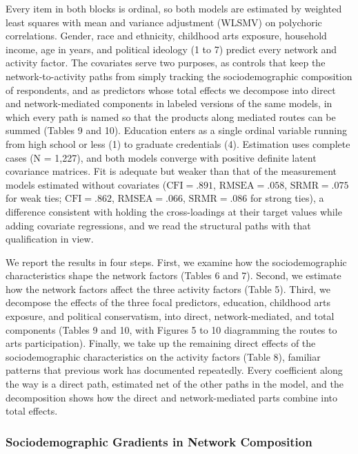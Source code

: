 \documentclass[
  12pt
]{article}
\begin{document}
Every item in both blocks is ordinal, so both models are estimated by weighted least squares with mean and variance adjustment (WLSMV) on polychoric correlations. Gender, race and ethnicity, childhood arts exposure, household income, age in years, and political ideology (1 to 7) predict every network and activity factor. The covariates serve two purposes, as controls that keep the network-to-activity paths from simply tracking the sociodemographic composition of respondents, and as predictors whose total effects we decompose into direct and network-mediated components in labeled versions of the same models, in which every path is named so that the products along mediated routes can be summed (Tables 9 and 10). Education enters as a single ordinal variable running from high school or less (1) to graduate credentials (4). Estimation uses complete cases (N = 1,227), and both models converge with positive definite latent covariance matrices. Fit is adequate but weaker than that of the measurement models estimated without covariates ($\text{CFI} = .891$, $\text{RMSEA} = .058$, $\text{SRMR} = .075$ for weak ties; $\text{CFI} = .862$, $\text{RMSEA} = .066$, $\text{SRMR} = .086$ for strong ties), a difference consistent with holding the cross-loadings at their target values while adding covariate regressions, and we read the structural paths with that qualification in view.

We report the results in four steps. First, we examine how the sociodemographic characteristics shape the network factors (Tables 6 and 7). Second, we estimate how the network factors affect the three activity factors (Table 5). Third, we decompose the effects of the three focal predictors, education, childhood arts exposure, and political conservatism, into direct, network-mediated, and total components (Tables 9 and 10, with Figures 5 to 10 diagramming the routes to arts participation). Finally, we take up the remaining direct effects of the sociodemographic characteristics on the activity factors (Table 8), familiar patterns that previous work has documented repeatedly. Every coefficient along the way is a direct path, estimated net of the other paths in the model, and the decomposition shows how the direct and network-mediated parts combine into total effects.

\subsubsection{Sociodemographic Gradients in Network Composition}\label{sociodemographic-gradients-in-network-composition}
\end{document}
